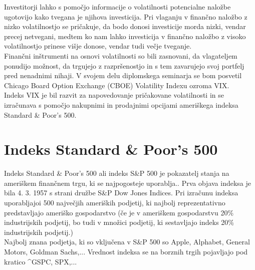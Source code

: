 \documentclass[12pt,a4paper]{amsart}
\theoremstyle{definition} %
\theoremstyle{plain} %
\begin{document}
Investitorji lahko s pomočjo informacije o volatilnosti potencialne naložbe ugotovijo kako tvegana je njihova investicija. Pri vlaganju v finančno naložbo z nizko volatilnostjo se pričakuje, da bodo donosi investicije morda nizki, vendar precej netvegani, medtem ko nam lahko investicija v finančno naložbo z visoko volatilnostjo prinese višje donose, vendar tudi večje tveganje.\\

Finančni inštrumenti na osnovi volatilnosti so bili zasnovani, da vlagateljem ponudijo možnost, da trgujejo z razpršenostjo in s tem zavarujejo svoj portfelj pred nenadnimi nihaji. V svojem delu diplomskega seminarja se bom posvetil Chicago Board Option Exchange (CBOE) Volatility Indexu ozroma VIX.\\
Indeks VIX je bil razvit za napovedovanje pričakovane volatilnosti in se izračunava s pomočjo nakupnimi in prodajnimi opcijami ameriškega indeksa Standard \& Poor's 500.
\newpage


\section{Indeks Standard \& Poor's 500}
Indeks Standard \& Poor's 500 ali indeks S\&P 500 je pokazatelj stanja na ameriškem finančnem trgu, ki se najpogosteje uporablja.. Prva objava indeksa je bila 4. 3. 1957 s strani družbe S\&P Dow Jones Indices. Pri izračunu indeksa uporabljajoi 500 največjih ameriških podjetij, ki najbolj reprezentativno predstavljajo ameriško gospodarstvo (če je v ameriškem gospodarstvu 20\% industrijskih podjetij, bo tudi v množici podjetij, ki sestavljajo indeks 20\% industrijskih podjetij.)\\
Najbolj znana podjetja, ki so vključena v S\&P 500 so Apple, Alphabet, General Motors, Goldman Sachs,...
Vrednost indeksa se na borznih trgih pojavljajo pod kratico \^{}GSPC, SPX,... 
\end{document}
